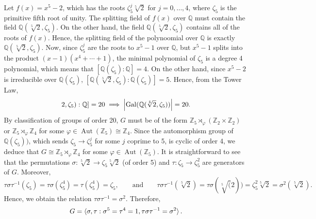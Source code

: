\documentclass{article}
\begin{document}
\begin{solutions}
	Let $f(x) = x^{5} - 2$, which has the roots $\zeta_{5}^{j}\sqrt[5]{2}$ for $j = 0, \ldots, 4$, where $\zeta_{5}$ is the primitive fifth root of unity. The splitting field of $f(x)$ over $\mathbb{Q}$ must contain the field $\mathbb{Q}(\sqrt[5]{2}, \zeta_{5})$. On the other hand, the field $\mathbb{Q}(\sqrt[5]{2}, \zeta_{5})$ contains all of the roots of $f(x)$. Hence, the splitting field of the polynoomial over $\mathbb{Q}$ is exactly $\mathbb{Q}(\sqrt[5]{2}, \zeta_{5})$. Now, since $\zeta_{5}^{j}$ are the roots to $x^{5} - 1$ over $\mathbb{Q}$, but $x^{5} - 1$ splits into the product $(x -1)(x^{4} + \dotsm + 1)$, the minimal polynomial of $\zeta_{5}$ is a degree 4 polynomial, which means that $[\mathbb{Q}(\zeta_{5}): \mathbb{Q}] = 4$. On the other hand, since $x^{5} - 2$ is irreducible over $\mathbb{Q}(\zeta_{5})$, $[\mathbb{Q}(\sqrt[5]{2},\zeta_{5}): \mathbb{Q}(\zeta_{5})] = 5$. Hence, from the Tower Law, 
		\begin{equation}
			[\mathbb{Q}(\sqrt[5]{2},\zeta_{5}):\mathbb{Q}] = 20 \implies \abs{\operatorname{Gal}(\mathbb{Q}(\sqrt[5]{2},\zeta_{5}))} = 20. 
		\end{equation}
	By classification of groups of order 20, $G$ must be of the form $\mathbb{Z}_{5} \rtimes_{\varphi} (\mathbb{Z}_{2} \times \mathbb{Z}_{2})$ or $\mathbb{Z}_{5} \rtimes_{\varphi} \mathbb{Z}_{4}$ for some $\varphi \in \operatorname{Aut}(\mathbb{Z}_{5}) \cong \mathbb{Z}_{4}$. Since the automorphism group of $\mathbb{Q}(\zeta_{5}))$, which sends $\zeta_{5} \to \zeta_{5}^{j}$ for some $j$ coprime to 5, is cyclic of order 4, we deduce that $G \cong \mathbb{Z}_{5} \rtimes_{\varphi} \mathbb{Z}_{4}$ for some $\varphi \in \operatorname{Aut}(\mathbb{Z}_{5})$. It is straightforward to see that the permutations $\sigma: \sqrt[5]{2} \to \zeta_{5}\sqrt[5]{2}$ (of order 5) and $\tau: \zeta_{5} \to \zeta_{5}^{2}$ are generators of $G$. Moreover, 
		\begin{equation}
			\tau\sigma\tau^{-1}(\zeta_{5}) = \tau\sigma(\zeta_{5}^{4}) = \tau(\zeta_{5}^{4}) = \zeta_{5}, \qquad \text{and} \qquad \tau\sigma\tau^{-1}(\sqrt[5]{2}) = \tau\sigma(\sqrt[5](2)) = \zeta_{5}^{2}\sqrt[5]{2} = \sigma^{2}(\sqrt[5]{2}). 
		\end{equation}
	Hence, we obtain the relation $\tau\sigma\tau^{-1} = \sigma^{2}$. Therefore, 
		\begin{equation}
			G = \braket{\sigma,\tau: \sigma^{5} = \tau^{4} = 1, \tau\sigma\tau^{-1} = \sigma^{2}}. 
		\end{equation}
\end{solutions}
\end{document}
